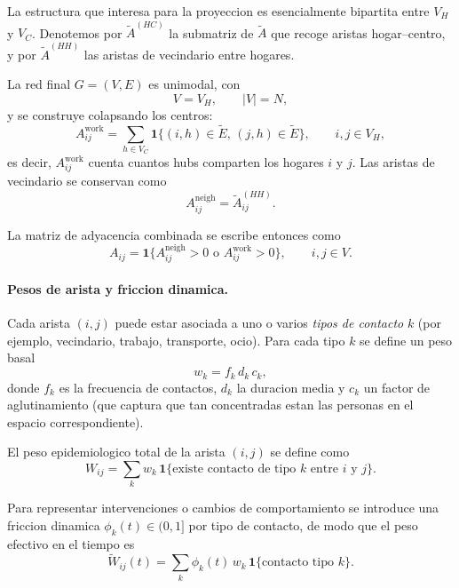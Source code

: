 La estructura que interesa para la proyeccion es esencialmente bipartita entre $V_H$ y $V_C$. Denotemos por $\tilde{A}^{(HC)}$ la submatriz de $\tilde{A}$ que recoge aristas hogar–centro, y por $\tilde{A}^{(HH)}$ las aristas de vecindario entre hogares.

La red final $G = (V,E)$ es unimodal, con
\[
V = V_H, \qquad |V| = N,
\]
y se construye colapsando los centros:
\begin{equation}
  A^{\text{work}}_{ij}
  = \sum_{h \in V_C} \mathbf{1}\{ (i,h) \in \tilde{E},\, (j,h) \in \tilde{E} \},
  \qquad i,j \in V_H,
\end{equation}
es decir, $A^{\text{work}}_{ij}$ cuenta cuantos hubs comparten los hogares $i$ y $j$. Las aristas de vecindario se conservan como
\[
A^{\text{neigh}}_{ij} = \tilde{A}^{(HH)}_{ij}.
\]

La matriz de adyacencia combinada se escribe entonces como
\begin{equation}
  A_{ij} = \mathbf{1}\{A^{\text{neigh}}_{ij} > 0 \text{ o } A^{\text{work}}_{ij} > 0\}, 
  \qquad i,j \in V.
\end{equation}

\paragraph*{Pesos de arista y friccion dinamica.}

Cada arista $(i,j)$ puede estar asociada a uno o varios \emph{tipos de contacto} $k$ (por ejemplo, vecindario, trabajo, transporte, ocio). Para cada tipo $k$ se define un peso basal
\begin{equation}
  w_k = f_k \, d_k \, c_k,
\end{equation}
donde $f_k$ es la frecuencia de contactos, $d_k$ la duracion media y $c_k$ un factor de aglutinamiento (que captura que tan concentradas estan las personas en el espacio correspondiente).

El peso epidemiologico total de la arista $(i,j)$ se define como
\begin{equation}
  W_{ij} = \sum_{k} w_k \, \mathbf{1}\{ \text{existe contacto de tipo } k \text{ entre } i \text{ y } j \}.
\end{equation}

Para representar intervenciones o cambios de comportamiento se introduce una friccion dinamica $\phi_k(t) \in (0,1]$ por tipo de contacto, de modo que el peso efectivo en el tiempo es
\begin{equation}
  \tilde{W}_{ij}(t) = \sum_{k} \phi_k(t) \, w_k \, \mathbf{1}\{ \text{contacto tipo } k \}.
\end{equation}

